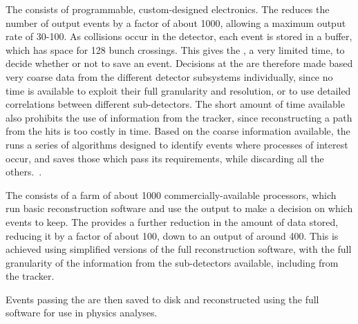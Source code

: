 The \LI consists of programmable, custom-designed electronics. The \LI reduces the number of output events by a factor of about 1000, allowing a maximum output rate of 30-100\kHz. As collisions occur in the \CMS detector, each event is stored in a buffer, which has space for 128 bunch crossings. This gives the \us, a very limited time, to decide whether or not to save an event. Decisions at the \LI are therefore made based very coarse data from the different detector subsystems individually, since no time is available to exploit their full granularity and resolution, or to use detailed correlations between different sub-detectors. The short amount of time available also prohibits the use of information from the tracker, since reconstructing a path from the hits is too costly in time. Based on the coarse information available, the \LI runs a series of algorithms designed to identify events where processes of interest occur, and saves those which pass its requirements, while discarding all the others.~\cite{CMSatLHC}.

The \HLT consists of a farm of about 1000 commercially-available processors, which run basic reconstruction software and use the output to make a decision on which events to keep. The \HLT provides a further reduction in the amount of data stored, reducing it by a factor of about 100, down to an output of around 400\Hz. This is achieved using simplified versions of the full \CMS reconstruction software, with the full granularity of the information from the \CMS sub-detectors available, including from the tracker.~\cite{CMSatLHC}

Events passing the \HLT are then saved to disk and reconstructed using the full \CMS software for use in physics analyses.

